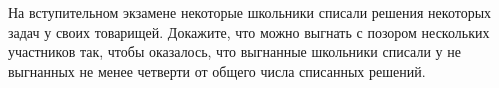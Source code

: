На вступительном экзамене некоторые школьники списали решения некоторых задач у своих
товарищей. Докажите, что можно выгнать с позором нескольких участников так, чтобы оказалось, что
выгнанные школьники списали у не выгнанных не менее четверти от общего числа списанных решений.
